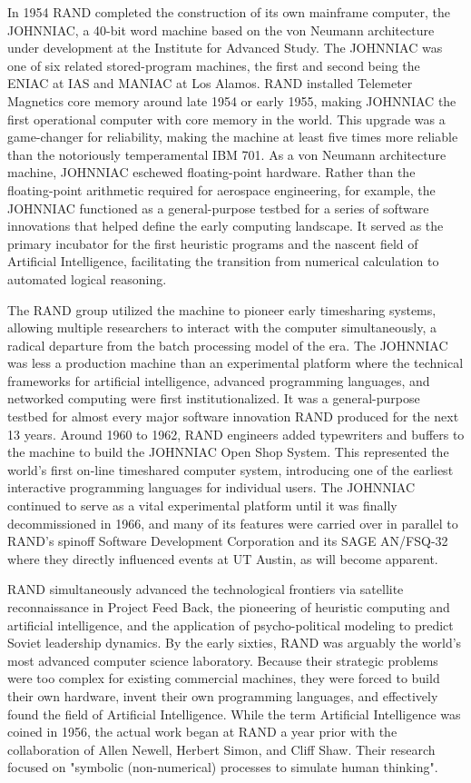In 1954 RAND completed the construction of its own mainframe computer, the JOHNNIAC, a 40-bit word machine based on the von Neumann architecture under development at the Institute for Advanced Study. The JOHNNIAC was one of six related stored-program machines, the first and second being the ENIAC at IAS and MANIAC at Los Alamos. RAND installed Telemeter Magnetics core memory around late 1954 or early 1955, making JOHNNIAC the first operational computer with core memory in the world. This upgrade was a game-changer for reliability, making the machine at least five times more reliable than the notoriously temperamental IBM 701. As a von Neumann architecture machine, JOHNNIAC eschewed floating-point hardware. Rather than the floating-point arithmetic required for aerospace engineering, for example, the JOHNNIAC functioned as a general-purpose testbed for a series of software innovations that helped define the early computing landscape. It served as the primary incubator for the first heuristic programs and the nascent field of Artificial Intelligence, facilitating the transition from numerical calculation to automated logical reasoning. 

The RAND group utilized the machine to pioneer early timesharing systems, allowing multiple researchers to interact with the computer simultaneously, a radical departure from the batch processing model of the era. The JOHNNIAC was less a production machine than an experimental platform where the technical frameworks for artificial intelligence, advanced programming languages, and networked computing were first institutionalized. It was a general-purpose testbed for almost every major software innovation RAND produced for the next 13 years. Around 1960 to 1962, RAND engineers added typewriters and buffers to the machine to build the JOHNNIAC Open Shop System. This represented the world's first on-line timeshared computer system, introducing one of the earliest interactive programming languages for individual users. The JOHNNIAC continued to serve as a vital experimental platform until it was finally decommissioned in 1966, and many of its features were carried over in parallel to RAND’s spinoff Software Development Corporation and its SAGE AN/FSQ-32 where they directly influenced events at UT Austin, as will become apparent. 

RAND simultaneously advanced the technological frontiers via satellite reconnaissance in Project Feed Back, the pioneering of heuristic computing and artificial intelligence, and the application of psycho-political modeling to predict Soviet leadership dynamics. By the early sixties, RAND was arguably the world’s most advanced computer science laboratory. Because their strategic problems were too complex for existing commercial machines, they were forced to build their own hardware, invent their own programming languages, and effectively found the field of Artificial Intelligence. While the term Artificial Intelligence was coined in 1956, the actual work began at RAND a year prior with the collaboration of Allen Newell, Herbert Simon, and Cliff Shaw. Their research focused on "symbolic (non-numerical) processes to simulate human thinking". 

